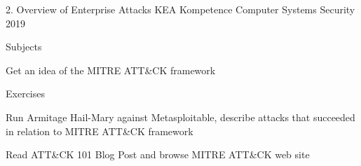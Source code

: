 \documentclass[Screen16to9,17pt]{foils}
\begin{document}
\mytitlepage
{2. Overview of Enterprise Attacks}
{KEA Kompetence Computer Systems Security 2019}



\begin{list1}
\item Subjects
\begin{list2}
\item Get an idea of the MITRE ATT\&CK framework
\item
\item
\end{list2}
\item Exercises
\begin{list2}
\item Run Armitage Hail-Mary against Metasploitable, describe attacks that succeeded in relation to MITRE ATT\&CK framework
\item
\end{list2}
\end{list1}




\begin{list1}
\item
Read ATT\&CK 101 Blog Post and browse MITRE ATT\&CK web site 
\end{list1}




\slidenext
\end{document}
